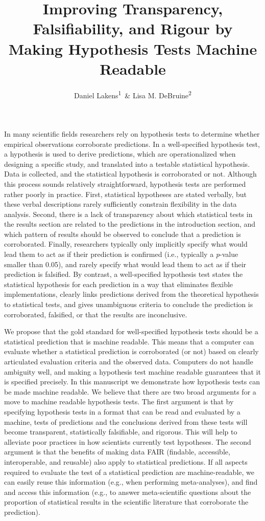 \documentclass[
  english,
  doc,floatsintext]{apa6}
\author{Daniel Lakens\textsuperscript{1}\ \& Lisa M. DeBruine\textsuperscript{2}}
\affiliation{
\vspace{0.5cm}
\textsuperscript{1} School of Innovation Sciences, Eindhoven University of Technology\\\textsuperscript{2} Institute of Neuroscience and Psychology, University of Glasgow}
\title{Improving Transparency, Falsifiability, and Rigour by Making Hypothesis Tests Machine Readable}
\date{}
\begin{document}
\maketitle

In many scientific fields researchers rely on hypothesis tests to determine whether empirical observations corroborate predictions. In a well-specified hypothesis test, a hypothesis is used to derive predictions, which are operationalized when designing a specific study, and translated into a testable statistical hypothesis. Data is collected, and the statistical hypothesis is corroborated or not. Although this process sounds relatively straightforward, hypothesis tests are performed rather poorly in practice. First, statistical hypotheses are stated verbally, but these verbal descriptions rarely sufficiently constrain flexibility in the data analysis. Second, there is a lack of transparency about which statistical tests in the results section are related to the predictions in the introduction section, and which pattern of results should be observed to conclude that a prediction is corroborated. Finally, researchers typically only implicitly specify what would lead them to act as if their prediction is confirmed (i.e., typically a \emph{p}-value smaller than 0.05), and rarely specify what would lead them to act as if their prediction is falsified. By contrast, a well-specified hypothesis test states the statistical hypothesis for each prediction in a way that eliminates flexible implementations, clearly links predictions derived from the theoretical hypothesis to statistical tests, and gives unambiguous criteria to conclude the prediction is corroborated, falsified, or that the results are inconclusive.

We propose that the gold standard for well-specified hypothesis tests should be a statistical prediction that is machine readable. This means that a computer can evaluate whether a statistical prediction is corroborated (or not) based on clearly articulated evaluation criteria and the observed data. Computers do not handle ambiguity well, and making a hypothesis test machine readable guarantees that it is specified precisely. In this manuscript we demonstrate how hypothesis tests can be made machine readable. We believe that there are two broad arguments for a move to machine readable hypothesis tests. The first argument is that by specifying hypothesis tests in a format that can be read and evaluated by a machine, tests of predictions and the conclusions derived from these tests will become transparent, statistically falsifiable, and rigorous. This will help to alleviate poor practices in how scientists currently test hypotheses. The second argument is that the benefits of making data FAIR (findable, accessible, interoperable, and reusable) also apply to statistical predictions. If all aspects required to evaluate the test of a statistical prediction are machine-readable, we can easily reuse this information (e.g., when performing meta-analyses), and find and access this information (e.g., to answer meta-scientific questions about the proportion of statistical results in the scientific literature that corroborate the prediction).
\end{document}
